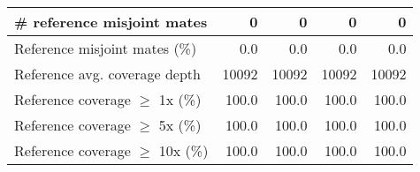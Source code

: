 \documentclass[12pt,a4paper]{article}
\begin{document}
\begin{table}[ht]
\begin{center}
\begin{tabular}{|l*{4}{|r}|}
\# reference misjoint mates & 0 & 0 & 0 & 0 \\ \hline
Reference misjoint mates (\%) & 0.0 & 0.0 & 0.0 & 0.0 \\ \hline
Reference avg. coverage depth & 10092 & 10092 & 10092 & 10092 \\ \hline
Reference coverage $\geq$ 1x (\%) & 100.0 & 100.0 & 100.0 & 100.0 \\ \hline
Reference coverage $\geq$ 5x (\%) & 100.0 & 100.0 & 100.0 & 100.0 \\ \hline
Reference coverage $\geq$ 10x (\%) & 100.0 & 100.0 & 100.0 & 100.0 \\ \hline
\end{tabular}
\end{center}
\end{table}
\end{document}
